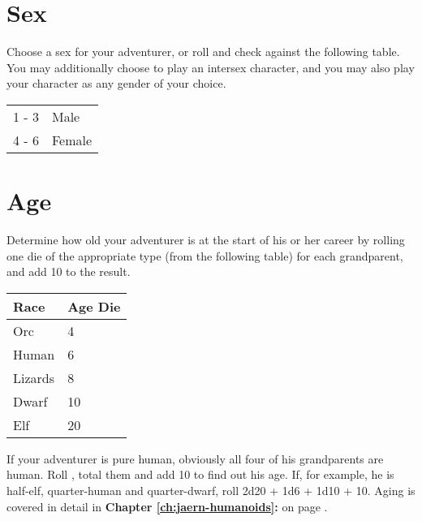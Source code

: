 \begin{multicols*}{2}
\section{Sex}
Choose a sex for your adventurer, or roll  and
check against the following table. You may additionally choose to play an intersex character, and you may also play your character as any gender of your choice.
\begin{tcolorbox}[breakable,boxrule=0pt,title=\textbf{Sex Roll}]
\begin{tabular}{l l}
1 - 3 & Male\\
4 - 6 & Female
\end{tabular}
\end{tcolorbox}
\section{Age}
Determine how old your adventurer is at the start of his or her career by rolling one die of the appropriate type
(from the following table) for each grandparent, and add 10 to the result.
\begin{tcolorbox}[breakable,boxrule=0pt,title=\textbf{Age Die}]
\begin{tabular}{l l}
\textbf{Race} & \textbf{Age Die}\\
\midrule
Orc & 4\\
Human & 6\\
Lizards &  8\\
Dwarf & 10\\
Elf &  20\\
\end{tabular}
\end{tcolorbox}
If your adventurer is pure human, obviously all four of his grandparents are human. Roll , total them and add 10 to find out his age. If, for example, he is half-elf, quarter-human and quarter-dwarf, roll 2d20 + 1d6 + 1d10 + 10. Aging is covered in detail in \textbf{Chapter \ref{ch:jaern-humanoids}: } on page \textbf{\pageref{ch:jaern-humanoids}}.

\end{multicols*}
